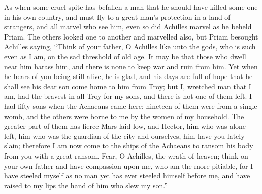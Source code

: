 As when some cruel spite has befallen a man that he should have killed
some one in his own country, and must fly to a great man’s protection in a
land of strangers, and all marvel who see him, even so did Achilles marvel
as he beheld Priam. The others looked one to another and marvelled also,
but Priam besought Achilles saying, “Think of your father, O Achilles like
unto the gods, who is such even as I am, on the sad threshold of old age.
It may be that those who dwell near him harass him, and there is none to
keep war and ruin from him. Yet when he hears of you being still alive, he
is glad, and his days are full of hope that he shall see his dear son come
home to him from Troy; but I, wretched man that I am, had the bravest in
all Troy for my sons, and there is not one of them left. I had fifty sons
when the Achaeans came here; nineteen of them were from a single womb, and
the others were borne to me by the women of my household. The greater part
of them has fierce Mars laid low, and Hector, him who was alone left, him
who was the guardian of the city and ourselves, him have you lately slain;
therefore I am now come to the ships of the Achaeans to ransom his body
from you with a great ransom. Fear, O Achilles, the wrath of heaven; think
on your own father and have compassion upon me, who am the more pitiable,
for I have steeled myself as no man yet has ever steeled himself before
me, and have raised to my lips the hand of him who slew my son.”

